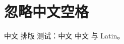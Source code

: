 \documentclass[a4paper,10pt,UTF8,scheme=chinese]{ctexart}
\begin{document}
\section{忽略中文空格}
中文 排版 测试：中文 中文 与 Latin。
\end{document}
